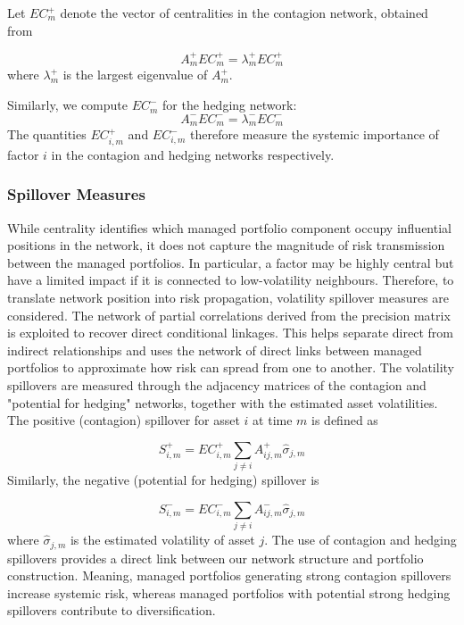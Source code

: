 \documentclass[11pt]{article}
\begin{document}
Let $EC^{+}_{m}$ denote the vector of centralities in the contagion network, obtained from

\begin{equation}\label{eq:12}
A_m^{+} EC_m^{+} = \lambda_m^{+} EC_m^{+}
\end{equation}
where $\lambda_m^{+}$ is the largest eigenvalue of $A_m^{+}$. 

Similarly, we compute $EC^{-}_{m}$ for the hedging network: 
\begin{equation}\label{eq:13}
A_m^{-} EC_m^{-} = \lambda_m^{-} EC_m^{-}
\end{equation}
The quantities $EC^{+}_{i,m}$ and $EC^{-}_{i,m}$ therefore measure the systemic importance of factor $i$ in the contagion and hedging networks respectively.

\subsubsection{Spillover Measures}
While centrality identifies which managed portfolio component occupy influential positions in the network, it does not capture the magnitude of risk transmission between the managed portfolios. In particular, a factor may be highly central but have a limited impact if it is connected to low-volatility neighbours. Therefore, to translate network position into risk propagation, volatility spillover measures are considered. The network of partial correlations derived from the precision matrix is exploited to recover direct conditional linkages. This helps separate direct from indirect relationships and uses the network of direct links between managed portfolios to approximate how risk can spread from one to another.
The volatility spillovers are measured through the adjacency matrices of the contagion and "potential for hedging" networks, together with the estimated asset volatilities. The positive (contagion) spillover for asset $i$ at time $m$ is defined as

\begin{equation}
S^{+}_{i,m} =
EC^{+}_{i,m}
\sum_{j \neq i} A^{+}_{ij,m} \hat{\sigma}_{j,m}
\end{equation}
Similarly, the negative (potential for hedging) spillover is

\begin{equation}
S^{-}_{i,m} =
EC^{-}_{i,m}
\sum_{j \neq i} A^{-}_{ij,m} \hat{\sigma}_{j,m}
\end{equation}
where $\hat{\sigma}_{j,m}$ is the estimated volatility of asset $j$. The use of contagion and hedging spillovers provides a direct link between our network structure and portfolio construction. Meaning, managed portfolios generating strong contagion spillovers increase systemic risk, whereas managed portfolios with potential strong hedging spillovers contribute to diversification.
\end{document}
